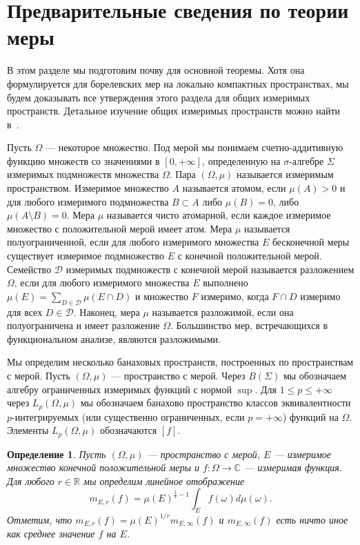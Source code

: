 \documentclass[12pt]{article}
\newtheorem{definition}[theorem]{Определение}
\begin{document}

\section{Предварительные сведения по теории меры}
\label{MeasThPrelim}

В этом разделе мы подготовим почву для основной теоремы. Хотя она формулируется 
для борелевских мер на локально компактных пространствах, мы будем доказывать 
все утверждения этого раздела для общих измеримых пространств. Детальное 
изучение общих измеримых пространств можно найти в~\cite{FremMeasTh2}.

Пусть $\Omega$ --- некоторое множество. Под мерой мы понимаем счетно-аддитивную 
функцию множеств со значениями в $[0,+\infty]$, определенную 
на $\sigma$-алгебре $\Sigma$ измеримых подмножеств множества $\Omega$. 
Пара $(\Omega,\mu)$ называется измеримым пространством. 
Измеримое множество $A$ называется атомом, если $\mu(A)>0$ и для любого 
измеримого подмножества $B\subset A$ либо $\mu(B)=0$, 
либо $\mu(A\setminus B)=0$. Мера $\mu$ называется чисто атомарной, если каждое 
измеримое множество с положительной мерой имеет атом. Мера $\mu$ называется 
полуограниченной, если для любого измеримого множества $E$ бесконечной меры 
существует измеримое подмножество $E$ с конечной положительной мерой. 
Семейство $\mathcal{D}$ измеримых подмножеств с конечной мерой называется 
разложением $\Omega$, если для любого измеримого множества $E$ 
выполнено $\mu(E)=\sum_{D\in\mathcal{D}}\mu(E\cap D)$ и множество $F$ измеримо, 
когда $F\cap D$ измеримо для всех $D\in\mathcal{D}$. Наконец, мера $\mu$ 
называется разложимой, если она полуограничена и имеет разложение $\Omega$. 
Большинство мер, встречающихся в функциональном анализе, являются разложимыми.

Мы определим несколько банаховых пространств, построенных по пространствам с 
мерой. Пусть $(\Omega,\mu)$ --- пространство с мерой. Через $B(\Sigma)$ мы 
обозначаем алгебру ограниченных измеримых функций с нормой $\sup$. 
Для $1\leq p\leq +\infty$ через $L_p(\Omega,\mu)$ мы обозначаем банахово 
пространство классов эквивалентности $p$-интегрируемых (или существенно 
ограниченных, если $p=+\infty$) функций на $\Omega$. Элементы $L_p(\Omega,\mu)$ 
обозначаются $[f]$.

\begin{definition}\label{GnrlzdMean}
    Пусть $(\Omega,\mu)$ --- пространство с мерой, $E$ --- измеримое множество 
    конечной положительной меры и $f:\Omega\to\mathbb{C}$ --- измеримая 
    функция. Для любого $r\in\mathbb{R}$ мы определим линейное отображение
    \[
        m_{E,r}(f)=\mu(E)^{\frac{1}{r}-1}\int_E f(\omega)d\mu(\omega).
    \]
    Отметим, что $m_{E,r}(f)=\mu(E)^{1/r}m_{E,\infty}(f)$ и $m_{E,\infty}(f)$ 
    есть ничто иное как среднее значение $f$ на $E$.
\end{definition}
\end{document}
